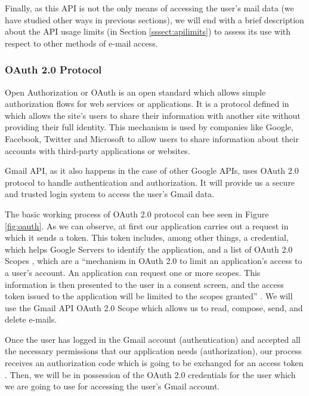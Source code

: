 Finally, as this API is not the only means of accessing the user's mail data (we have studied other ways in previous sections), we will end with a brief description about the API usage limits (in Section \ref{sssect:apilimits}) to assess its use with respect to other methods of e-mail access.

\subsubsection{OAuth 2.0 Protocol}\label{sssect:oauth}
Open Authorization or OAuth \citep{oauth} is an open standard which allows simple authorization flows for web services or applications. It is a protocol defined in \cite{rfc6749} which allows the site's users to share their information with another site without providing their full identity. This mechanism is used by companies like Google, Facebook, Twitter and Microsoft to allow users to share information about their accounts with third-party applications or websites.

Gmail API, as it also happens in the case of other Google APIs, uses OAuth 2.0 protocol \citep{oauthforgoogle} to handle authentication and authorization. It will provide us a secure and trusted login system to access the user's Gmail data.

The basic working process of OAuth 2.0 protocol can bee seen in Figure \ref{fig:oauth}. As we can observe, at first our application carries out a request in which it sends a token. This token includes, among other things, a credential, which helps Google Servers  to identify the application, and a list of OAuth 2.0 Scopes \citep{oauth-scopes-google}, which are a ``mechanism  in OAuth 2.0 to limit an application's access to a user's account. An application can request one or more scopes. This information is then presented to the user in a consent screen, and the access token issued to the application will be limited to the scopes granted'' \citep{oauth-scopes}. We will use the Gmail API OAuth 2.0 Scope which allows us to read, compose, send, and delete e-mails.

Once the user has logged in the Gmail account (authentication) and accepted all the necessary permissions that our application needs (authorization), our process receives an authorization code which is going to be exchanged for an access token \citep{oauth-exchange}. Then, we will be in possession of the OAuth 2.0 credentials for the user \citep{oauth2.credentials} which we are going to use for accessing the user's Gmail account.

